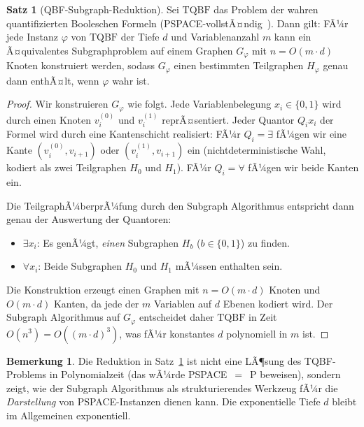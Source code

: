 ﻿\documentclass[a4paper,12pt]{article}
\theoremstyle{definition}
\newtheorem{satz}{Satz}
\newtheorem{bemerkung}{Bemerkung}
\begin{document}
\begin{satz}[QBF-Subgraph-Reduktion]
\label{satz:qbf}
  Sei $\mathrm{TQBF}$ das Problem der wahren quantifizierten Booleschen Formeln
  (PSPACE-vollstÃ¤ndig~\cite{stockmeyer1973word}).
  Dann gilt: FÃ¼r jede Instanz $\varphi$ von $\mathrm{TQBF}$ der Tiefe $d$ und
  Variablenanzahl $m$ kann ein Ã¤quivalentes Subgraphproblem auf einem
  Graphen $G_\varphi$ mit $n = O(m \cdot d)$ Knoten konstruiert werden,
  sodass $G_\varphi$ einen bestimmten Teilgraphen $H_\varphi$ genau dann enthÃ¤lt,
  wenn $\varphi$ wahr ist.
\end{satz}

\begin{proof}
  Wir konstruieren $G_\varphi$ wie folgt.
  Jede Variablenbelegung $x_i \in \{0, 1\}$ wird durch einen Knoten $v_i^{(0)}$
  und $v_i^{(1)}$ reprÃ¤sentiert.
  Jeder Quantor $Q_i x_i$ der Formel wird durch eine Kantenschicht realisiert:
  FÃ¼r $Q_i = \exists$ fÃ¼gen wir eine Kante $(v_i^{(0)}, v_{i+1})$ oder
  $(v_i^{(1)}, v_{i+1})$ ein (nichtdeterministische Wahl, kodiert als zwei
  Teilgraphen $H_0$ und $H_1$).
  FÃ¼r $Q_i = \forall$ fÃ¼gen wir beide Kanten ein.

  Die TeilgraphÃ¼berprÃ¼fung durch den Subgraph Algorithmus entspricht dann
  genau der Auswertung der Quantoren:
  \begin{itemize}
    \item $\exists x_i$: Es genÃ¼gt, \emph{einen} Subgraphen $H_b$ ($b \in \{0,1\}$) zu finden.
    \item $\forall x_i$: Beide Subgraphen $H_0$ und $H_1$ mÃ¼ssen enthalten sein.
  \end{itemize}

  Die Konstruktion erzeugt einen Graphen mit $n = O(m \cdot d)$ Knoten und
  $O(m \cdot d)$ Kanten, da jede der $m$ Variablen auf $d$ Ebenen kodiert wird.
  Der Subgraph Algorithmus auf $G_\varphi$ entscheidet daher $\mathrm{TQBF}$
  in Zeit $O(n^3) = O((m \cdot d)^3)$, was fÃ¼r konstantes $d$ polynomiell in $m$ ist.
\end{proof}

\begin{bemerkung}
  Die Reduktion in Satz~\ref{satz:qbf} ist nicht eine LÃ¶sung des TQBF-Problems
  in Polynomialzeit (das wÃ¼rde PSPACE~$=$~P beweisen), sondern zeigt,
  wie der Subgraph Algorithmus als strukturierendes Werkzeug fÃ¼r die
  \emph{Darstellung} von PSPACE-Instanzen dienen kann.
  Die exponentielle Tiefe $d$ bleibt im Allgemeinen exponentiell.
\end{bemerkung}
\end{document}
